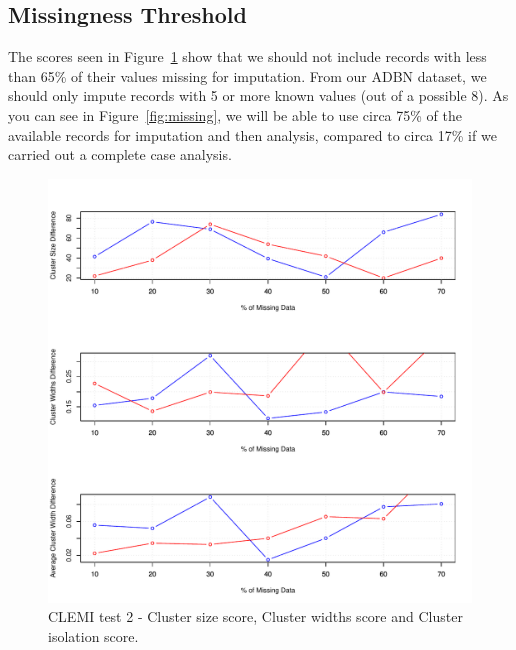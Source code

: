 \documentclass[conference,compsoc]{IEEEtran}
\begin{document}
	\subsection{Missingness Threshold} %
	\label{sub:missingness_threshold}
	The scores seen in Figure~\ref{fig:clemi-limit2} show that we should not include records with less than 65\% of their values missing for imputation. From our ADBN dataset, we should only impute records with 5 or more known values (out of a possible 8). As you can see in Figure~\ref{fig:missing}, we will be able to use circa 75\% of the available records for imputation and then analysis, compared to circa 17\% if we carried out a complete case analysis. 
	\\
	\begin{figure}[!ht]
		\centering
		\includegraphics[width=\textwidth]{AMND4}
		\caption{CLEMI test 2 - Cluster size score, Cluster widths score and Cluster isolation score. }
		\label{fig:clemi-limit2}
	\end{figure}
	





\end{document}
